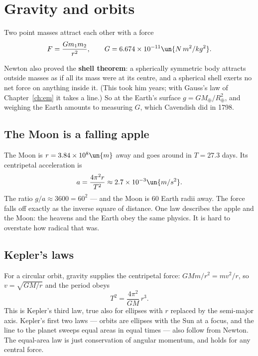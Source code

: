 \section{Gravity and orbits}

\begin{law}
Two point masses attract each other with a force
\[
  F = \frac{G m_1 m_2}{r^{2}}, \qquad G = 6.674\times10^{-11}\un{N\,m^2/kg^2}.
\]
\end{law}
Newton also proved the \textbf{shell theorem}: a spherically symmetric body attracts outside masses as if all its mass were at its centre, and a spherical shell exerts no net force on anything inside it. (This took him years; with Gauss's law of Chapter~\ref{ch:em} it takes a line.) So at the Earth's surface $g = GM_\oplus/R_\oplus^2$, and weighing the Earth amounts to measuring $G$, which Cavendish did in 1798.

\subsection{The Moon is a falling apple}
\label{sec:moon-apple}
The Moon is $r = 3.84\times10^{8}\un{m}$ away and goes around in $T = 27.3$ days. Its centripetal acceleration is
\[
  a = \frac{4\pi^{2}r}{T^{2}} \approx 2.7\times10^{-3}\un{m/s^2}.
\]
The ratio $g/a \approx 3600 = 60^2$ --- and the Moon is $60$ Earth radii away. The force falls off exactly as the inverse square of distance. One law describes the apple and the Moon: the heavens and the Earth obey the same physics. It is hard to overstate how radical that was.

\subsection{Kepler's laws}
For a circular orbit, gravity supplies the centripetal force: $GMm/r^2 = mv^2/r$, so $v = \sqrt{GM/r}$ and the period obeys
\[
  T^{2} = \frac{4\pi^{2}}{GM}\,r^{3}.
\]
This is Kepler's third law, true also for ellipses with $r$ replaced by the semi-major axis. Kepler's first two laws --- orbits are ellipses with the Sun at a focus, and the line to the planet sweeps equal areas in equal times --- also follow from Newton. The equal-area law is just conservation of angular momentum, and holds for any central force.

